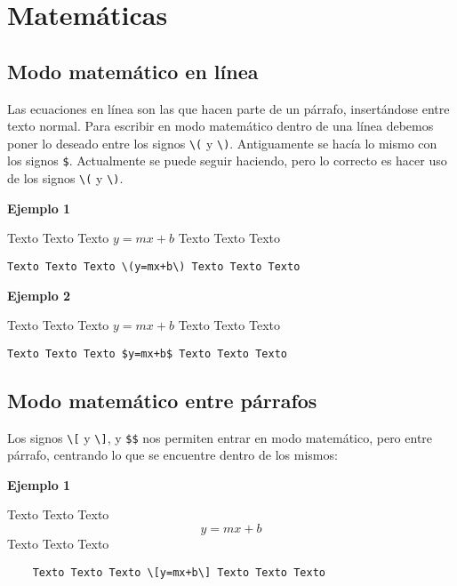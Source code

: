 \section{Matemáticas}

\subsection{Modo matemático en línea}

Las ecuaciones en línea son las que hacen parte de un párrafo, insertándose entre texto normal. Para escribir en modo matemático dentro de una línea debemos poner lo deseado entre los signos \verb|\(| y \verb|\)|. Antiguamente se hacía lo mismo con los signos \verb|$|. Actualmente se puede seguir haciendo, pero lo correcto es hacer uso de los signos \verb|\(| y \verb|\)|.

\textbf{Ejemplo 1}

Texto Texto Texto \(y=mx+b\) Texto Texto Texto 

\begin{myquote}
	\begin{lstlisting}
Texto Texto Texto \(y=mx+b\) Texto Texto Texto 
	\end{lstlisting}
\end{myquote}

\textbf{Ejemplo 2}

Texto Texto Texto $y=mx+b$ Texto Texto Texto 

\begin{myquote}
	\begin{lstlisting}
Texto Texto Texto $y=mx+b$ Texto Texto Texto 
	\end{lstlisting}
\end{myquote}

\subsection{Modo matemático entre párrafos}

Los signos \verb|\[| y \verb|\]|, y \verb|$$| nos permiten entrar en modo matemático, pero entre párrafo, centrando lo que se encuentre dentro de los mismos: 

\textbf{Ejemplo 1}

Texto Texto Texto \[y=mx+b\] Texto Texto Texto 

\begin{myquote}
	\begin{lstlisting}
	Texto Texto Texto \[y=mx+b\] Texto Texto Texto 
	\end{lstlisting}
\end{myquote}

